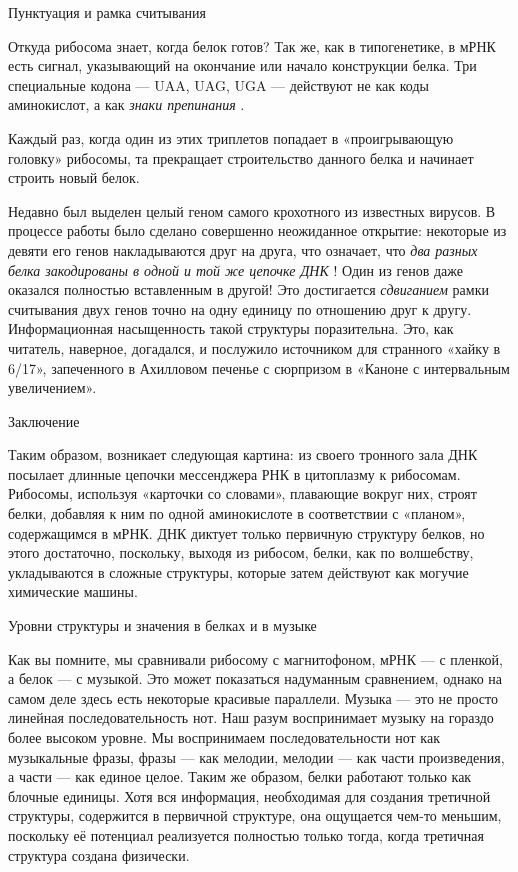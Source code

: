 \documentclass[../main.tex]{subfiles}
\begin{document}
Пунктуация и рамка считывания

Откуда рибосома знает, когда белок готов? Так же, как в типогенетике, в мРНК есть сигнал, указывающий на окончание или начало конструкции белка. Три специальные кодона --- UAA, UAG, UGA --- действуют не как коды аминокислот, а как \emph{знаки препинания} .

Каждый раз, когда один из этих триплетов попадает в «проигрывающую головку» рибосомы, та прекращает строительство данного белка и начинает строить новый белок.

Недавно был выделен целый геном самого крохотного из известных вирусов. В процессе работы было сделано совершенно неожиданное открытие: некоторые из девяти его генов накладываются друг на друга, что означает, что \emph{два разных белка закодированы в одной и той же цепочке ДНК} ! Один из генов даже оказался полностью вставленным в другой! Это достигается \emph{сдвиганием} рамки считывания двух генов точно на одну единицу по отношению друг к другу. Информационная насыщенность такой структуры поразительна. Это, как читатель, наверное, догадался, и послужило источником для странного «хайку в 6/17», запеченного в Ахилловом печенье с сюрпризом в «Каноне с интервальным увеличением».

Заключение

Таким образом, возникает следующая картина: из своего тронного зала ДНК посылает длинные цепочки мессенджера РНК в цитоплазму к рибосомам. Рибосомы, используя «карточки со словами», плавающие вокруг них, строят белки, добавляя к ним по одной аминокислоте в соответствии с «планом», содержащимся в мРНК\@. ДНК диктует только первичную структуру белков, но этого достаточно, поскольку, выходя из рибосом, белки, как по волшебству, укладываются в сложные структуры, которые затем действуют как могучие химические машины.

Уровни структуры и значения в белках и в музыке

Как вы помните, мы сравнивали рибосому с магнитофоном, мРНК --- с пленкой, а белок --- с музыкой. Это может показаться надуманным сравнением, однако на самом деле здесь есть некоторые красивые параллели. Музыка --- это не просто линейная последовательность нот. Наш разум воспринимает музыку на гораздо более высоком уровне. Мы воспринимаем последовательности нот как музыкальные фразы, фразы --- как мелодии, мелодии --- как части произведения, а части --- как единое целое. Таким же образом, белки работают только как блочные единицы. Хотя вся информация, необходимая для создания третичной структуры, содержится в первичной структуре, она ощущается чем-то меньшим, поскольку её потенциал реализуется полностью только тогда, когда третичная структура создана физически.
\end{document}
